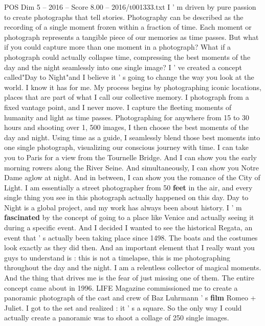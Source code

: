 \begin{textsample}{POS Dim 5 – 2016 – Score 8.00 – 2016/t001333.txt}  \label{ex:f5_pos_056}
I ' m driven by pure passion to create photographs that tell stories.
Photography can be described as the recording of a single moment frozen within a fraction of time.
Each moment or photograph represents a tangible piece of our memories as time passes.
But what if you could capture more than one moment in a photograph?
What if a photograph could actually collapse time, compressing the best moments of the day and the night seamlessly into one single image?
I ' ve created a concept called"Day to Night"and I believe it ' s going to change the way you look at the world.
I know it has for me.
My process begins by photographing iconic locations, places that are part of what I call our collective memory.
I photograph from a fixed vantage point, and I never move.
I capture the fleeting moments of humanity and light as time passes.
Photographing for anywhere from 15 to 30 hours and shooting over 1, 500 images, I then choose the best moments of the day and night.
Using time as a guide, I seamlessly blend those best moments into one single photograph, visualizing our conscious journey with time.
I can take you to Paris for a view from the Tournelle Bridge.
And I can show you the early morning rowers along the River Seine.
And simultaneously, I can show you Notre Dame aglow at night.
And in between, I can show you the romance of the City of Light.
I am essentially a street photographer from 50 \textbf{feet} in the air, and every single thing you see in this photograph actually happened on this day.
Day to Night is a global project, and my work has always been about history.
I ' m \textbf{fascinated} by the concept of going to a place like Venice and actually seeing it during a specific event.
And I decided I wanted to see the historical Regata, an event that ' s actually been taking place since 1498.
The boats and the costumes look exactly as they did then.
And an important element that I really want you guys to understand is : this is not a timelapse, this is me photographing throughout the day and the night.
I am a relentless collector of magical moments.
And the thing that drives me is the fear of just missing one of them.
The entire concept came about in 1996.
LIFE Magazine commissioned me to create a panoramic photograph of the cast and crew of Baz Luhrmann ' s \textbf{film} Romeo + Juliet.
I got to the set and realized : it ' s a square.
So the only way I could actually create a panoramic was to shoot a collage of 250 single images.

\end{textsample}
